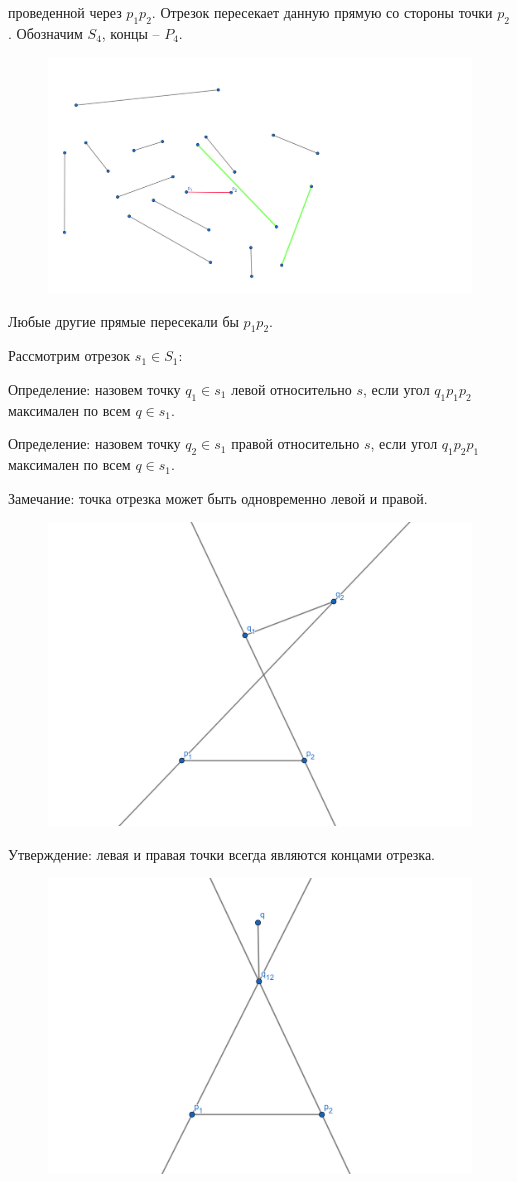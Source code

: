 \documentclass[letterpaper,12pt]{article}
\begin{document}
\begin{enumerate}
            проведенной через $p_1 p_2$. Отрезок пересекает
            данную прямую со стороны точки $p_2$.
            Обозначим $S_4$, концы -- $P_4$.
            \begin{figure}[H]
                  \centering
                  \includegraphics[width=0.5\linewidth]{segment_4.png}
            \end{figure}
            Любые другие прямые пересекали бы $p_1 p_2$.
\end{enumerate}

Рассмотрим отрезок $s_1 \in S_1$:

Определение: назовем точку $q_1 \in s_1$ левой относительно $s$,
если угол $q_1 p_1 p_2$ максимален по всем $q \in s_1$.

Определение: назовем точку $q_2 \in s_1$ правой относительно $s$,
если угол $q_1 p_2 p_1$ максимален по всем $q \in s_1$.

Замечание: точка отрезка может быть одновременно левой и правой.

\begin{figure}[H]
      \centering
      \includegraphics[width=0.5\linewidth]{one_segment_q1q2.png}
\end{figure}

Утверждение: левая и правая точки всегда являются концами отрезка.

\begin{figure}[H]
      \centering
      \includegraphics[width=0.5\linewidth]{one_segment_q12.png}
\end{figure}
\end{document}
